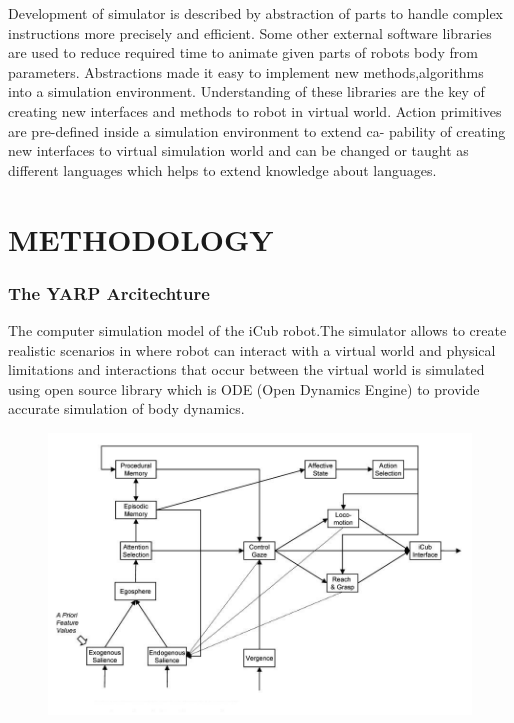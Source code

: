 \documentclass[a4paper, 12pt]{report}
\begin{document}
Development of simulator is described by abstraction of parts to handle complex 
instructions more precisely and efficient. Some other external software 
libraries are used to reduce required time to animate given parts of robots 
body from parameters. Abstractions made it easy to implement new 
methods,algorithms into a simulation environment. Understanding of these 
libraries are the key of creating new interfaces and methods to robot in 
virtual world.
Action primitives are pre-defined inside a simulation environment to extend ca- 
pability of creating new interfaces to virtual simulation world and can be 
changed or taught as different languages which helps to extend knowledge about 
languages.

\chapter{METHODOLOGY}

\subsection{The YARP Arcitechture}
The computer simulation model of the iCub robot.The simulator allows to 
create realistic scenarios in where robot can interact with a virtual world and 
physical limitations and interactions that occur between the virtual world is 
simulated using open source library which is ODE (Open Dynamics Engine) to 
provide accurate simulation of body dynamics.

\begin{figure}[h!]
\centering
\includegraphics[width=1.0\linewidth]{cognitive_architecture}
\caption{}
\label{fig:cognitive_architecture}
\end{figure}
\end{document}
